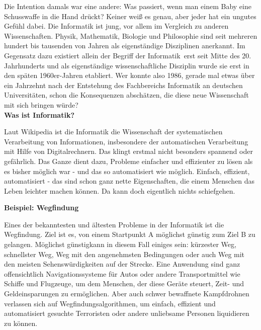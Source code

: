 {Die Intention damals war eine andere: Was passiert, wenn man einem Baby eine Schusswaffe in die Hand drückt? Keiner weiß es genau, aber jeder hat ein ungutes Gefühl dabei.
Die Informatik ist jung, vor allem im Vergleich zu anderen Wissenschaften. Physik, Mathematik, Biologie und Philosophie sind seit mehreren hundert bis tausenden von Jahren als eigenständige Disziplinen anerkannt.  Im Gegensatz dazu existiert allein der Begriff der \glqq Informatik\grqq~erst seit Mitte des 20. Jahrhunderts und als eigenständige wissenschaftliche Disziplin wurde sie erst in den späten 1960er-Jahren etabliert.
Wer konnte also 1986, gerade mal etwas über ein Jahrzehnt nach der Entstehung des Fachbereichs Informatik an deutschen Universitäten, schon die Konsequenzen abschätzen, die diese neue Wissenschaft mit sich bringen würde?\\

\textbf{Was ist Informatik?}

Laut Wikipedia ist die Informatik die \glqq Wissenschaft der systematischen Verarbeitung von Informationen, insbesondere der automatischen Verarbeitung mit Hilfe von Digitalrechnern\grqq.
Das klingt erstmal nicht besonders spannend oder gefährlich. Das Ganze dient dazu, Probleme einfacher und effizienter  zu lösen als es bisher möglich war - und das so automatisiert wie möglich. Einfach, effizient, automatisiert - das sind schon ganz nette Eigenschaften, die einem Menschen das Leben leichter machen können. Da kann doch eigentlich nichts schiefgehen.\\

\columnbreak

\textbf{Beispiel: Wegfindung}

Eines der bekanntesten und ältesten Probleme in der Informatik ist die Wegfindung. Ziel ist es, von einem Startpunkt A möglichst günstig zum Ziel B zu gelangen. \glqq Möglichst günstig\grqq kann in diesem Fall einiges sein: kürzester Weg, schnellster Weg, Weg mit den angenehmsten Bedingungen oder auch Weg mit den meisten Sehenswürdigkeiten auf der Strecke. Eine Anwendung sind ganz offensichtlich Navigationssysteme für Autos oder andere Transportmittel wie Schiffe und Flugzeuge, um dem Menschen, der diese Geräte steuert, Zeit- und Geldeinsparungen zu ermöglichen. Aber auch schwer bewaffnete Kampfdrohnen verlassen sich auf Wegfindungsalgorithmen, um einfach, effizient und automatisiert gesuchte Terroristen oder andere unliebsame Personen liquidieren zu können.\\

}
